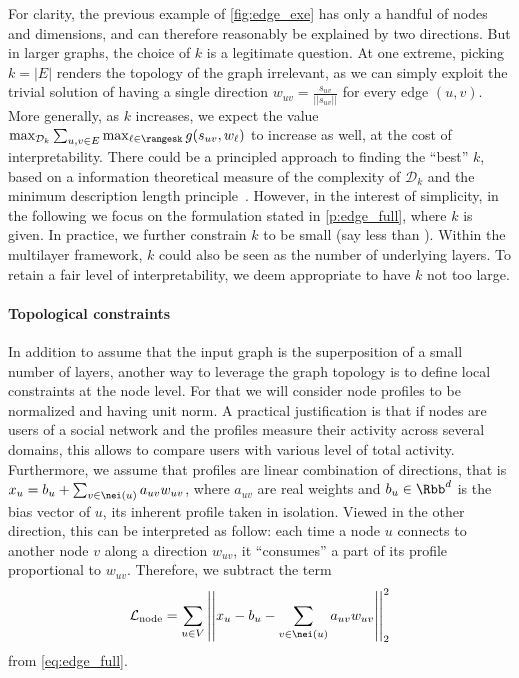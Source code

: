 For clarity, the previous example of \autoref{fig:edge_exe} has only a handful of nodes and
dimensions, and can therefore reasonably be explained by two directions. But in larger graphs, the
choice of $k$ is a legitimate question.
At one extreme, picking $k=|E|$ renders the topology of the graph
irrelevant, as we can simply exploit the trivial
solution of having a single direction $w_{uv} = \frac{s_{uv}}{||s_{uv}||}$ for every edge $(u,v)$.
More generally, as $k$ increases, we expect the value $\max_{\mathcal{D}_k} \sum_{u,v \in E}
\max_{\ell \in \rangesk} g(s_{uv}, w_{\ell})$ to increase as
well, at the cost of interpretability. There could be a principled approach to finding the
\enquote{best} $k$, based on a information theoretical measure of the complexity of $\mathcal{D}_k$
and the minimum description length principle~\autocite{grunwald2005tutorial}. However, in the
interest of simplicity, in the following we focus on the formulation stated in
\autoref{p:edge_full}, where $k$ is given. In practice, we further constrain $k$ to be small (say
less than ). Within the multilayer framework, $k$ could also be seen as the number of
underlying layers. To retain a fair level of interpretability, we deem appropriate to have $k$ not
too large.

\paragraph{Topological constraints}

In addition to assume that the input graph is the superposition of a small number of layers,
another way to leverage the graph topology is to define local constraints at the node level.
For that we will consider node profiles to be normalized and having unit norm. A practical
justification is that if nodes are
users of a social network and the profiles measure their activity across several domains, this
allows to compare users with various level of total activity. Furthermore, we assume that profiles
are linear combination of directions, that
is $x_u = b_u + \sum_{v \in \nei(u)} a_{uv} w_{uv}$, where $a_{uv}$ are real weights and $b_u
\in \Rbb^d$ is the bias vector of $u$, \ie{} its inherent profile taken in isolation.
Viewed in the other direction, this can be interpreted as follow: each time a node $u$
connects to another node $v$ along a direction $w_{uv}$, it \enquote{consumes} a part of its profile
proportional to $w_{uv}$. Therefore, we subtract the term
\begin{equation}
  \label{eq:edge_node_loss}
  \mathcal{L}_{\mathrm{node}} =
  \sum_{u\in V} \left|\left| x_u - b_u - \sum_{v \in \nei(u)} a_{uv} w_{uv} \right|\right|^2_2
\end{equation}
from \eqref{eq:edge_full}.

